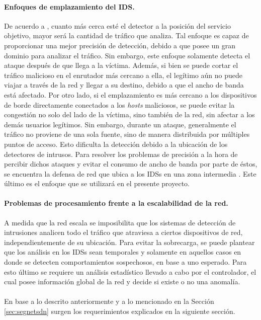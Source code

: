 \paragraph{Enfoques de emplazamiento del IDS.}
De acuerdo a \parencite{ddos_kumar}, cuanto más cerca esté el detector a la
posición del servicio objetivo, mayor será la cantidad de tráfico que analiza.
Tal enfoque es capaz de proporcionar una mejor precisión de detección, debido a
que posee un gran dominio para analizar el tráfico. Sin embargo, este enfoque
solamente detecta el ataque después de que llega a la víctima. Además, si bien
se puede cortar el tráfico malicioso en el enrutador más cercano a ella, el
legítimo aún no puede viajar a través de la red y llegar a su destino, debido a
que el ancho de banda está afectado. Por otro lado, si el emplazamiento es más
cercano a los dispositivos de borde directamente conectados a los \textit{hosts}
maliciosos, se puede evitar la congestión no solo del lado de la víctima, sino
también de la red, sin afectar a los demás usuarios legítimos. Sin embargo,
durante un ataque, generalmente el tráfico no proviene de una sola fuente, sino
de manera distribuida por múltiples puntos de acceso. Esto dificulta la
detección debido a la ubicación de los detectores de intrusos. Para resolver los
problemas de precisión a la hora de percibir dichos ataques y evitar el consumo
de ancho de banda por parte de éstos, se encuentra la defensa de red que ubica a
los IDSs en una zona intermedia \parencite{ddos_kumar}. Este último es el
enfoque que se utilizará en el presente proyecto.

\paragraph{Problemas de procesamiento frente a la escalabilidad de la red.} A
medida que la red escala se imposibilita que los sistemas de detección de
intrusiones analicen todo el tráfico que atraviesa a ciertos dispositivos de
red, independientemente de su ubicación. Para evitar la sobrecarga, se puede
plantear que los análisis en los IDSs sean temporales y solamente en aquellos
casos en donde se detecten comportamientos sospechosos, en base a uno esperado.
Para esto último se requiere un análisis estadístico llevado a cabo por el
controlador, el cual posee información global de la red y decide si existe o no
una anomalía.

\paragraph{} En base a lo descrito anteriormente y a lo mencionado en la Sección
\ref{sec:segnetsdn} surgen los requerimientos explicados en la siguiente
sección.

